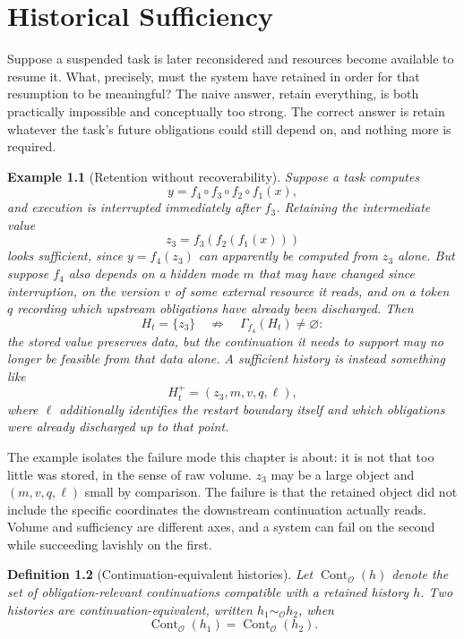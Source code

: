 \documentclass[11pt]{report}
\newtheorem{definition}{Definition}[chapter]
\newtheorem{example}[definition]{Example}
\begin{document}
\chapter{Historical Sufficiency}

Suppose a suspended task is later reconsidered and resources become available to resume it. What, precisely, must the system have retained in order for that resumption to be meaningful? The naive answer, retain everything, is both practically impossible and conceptually too strong. The correct answer is retain whatever the task's future obligations could still depend on, and nothing more is required.

\begin{example}[Retention without recoverability]
\label{ex:composition}
Suppose a task computes
\[
y = f_4 \circ f_3 \circ f_2 \circ f_1(x),
\]
and execution is interrupted immediately after $f_3$. Retaining the intermediate value
\[
z_3 = f_3(f_2(f_1(x)))
\]
looks sufficient, since $y = f_4(z_3)$ can apparently be computed from $z_3$ alone. But suppose $f_4$ also depends on a hidden mode $m$ that may have changed since interruption, on the version $v$ of some external resource it reads, and on a token $q$ recording which upstream obligations have already been discharged. Then
\[
H_t = \{z_3\} \quad \not\Rightarrow \quad \Gamma_{f_4}(H_t) \ne \varnothing:
\]
the stored value preserves data, but the continuation it needs to support may no longer be feasible from that data alone. A sufficient history is instead something like
\[
H_t^{+} = (z_3, m, v, q, \ell),
\]
where $\ell$ additionally identifies the restart boundary itself and which obligations were already discharged up to that point.
\end{example}

The example isolates the failure mode this chapter is about: it is not that too little was stored, in the sense of raw volume. $z_3$ may be a large object and $(m,v,q,\ell)$ small by comparison. The failure is that the retained object did not include the specific coordinates the downstream continuation actually reads. Volume and sufficiency are different axes, and a system can fail on the second while succeeding lavishly on the first.

\begin{definition}[Continuation-equivalent histories]
Let $\operatorname{Cont}_{\mathcal O}(h)$ denote the set of obligation-relevant continuations compatible with a retained history $h$. Two histories are continuation-equivalent, written $h_1 \sim_{\mathcal O} h_2$, when
\[
\operatorname{Cont}_{\mathcal O}(h_1) = \operatorname{Cont}_{\mathcal O}(h_2).
\]
\end{definition}
\end{document}
